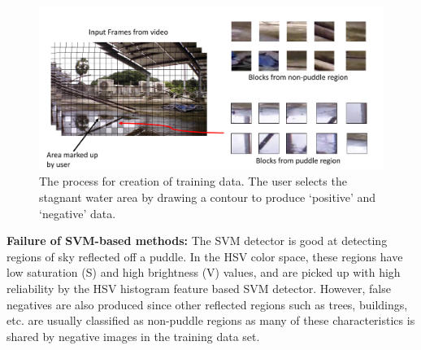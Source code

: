 \documentclass[times,10pt,twocolumn]{article}
\begin{document}




\begin{figure}[h!]
  \centering
  \includegraphics[width=0.9\linewidth]{images/trainingData.pdf}
  \caption{The process for creation of training data. The user selects
    the stagnant water area by drawing a contour to produce `positive'
    and `negative'  data.}
  \label{fig:training}
\end{figure}

\textbf{Failure of SVM-based methods:} The SVM detector is good at
detecting regions of sky reflected off a puddle.  In the HSV color
space, these regions have low saturation (S) and high brightness (V)
values, and are picked up with high reliability by the HSV histogram
feature based SVM detector. However, false negatives are also produced
since other reflected regions such as trees, buildings, etc. are
usually classified as non-puddle regions as many of these
characteristics is shared by negative images in the training data set.
\end{document}
